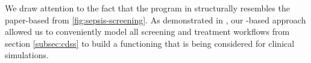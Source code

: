 We draw attention to the fact that the program in \MediK{} structurally
resembles the paper-based \BPG{} from \figurename{} \ref{fig:sepsis-screening}.
As demonstrated in \cite{SaxenaFMCAD23}, our \MediK{}-based approach allowed
us to conveniently model all screening and treatment workflows from section
\ref{subsec:cdss} to build a functioning \CDSS{} that is being considered for
clinical simulations.
